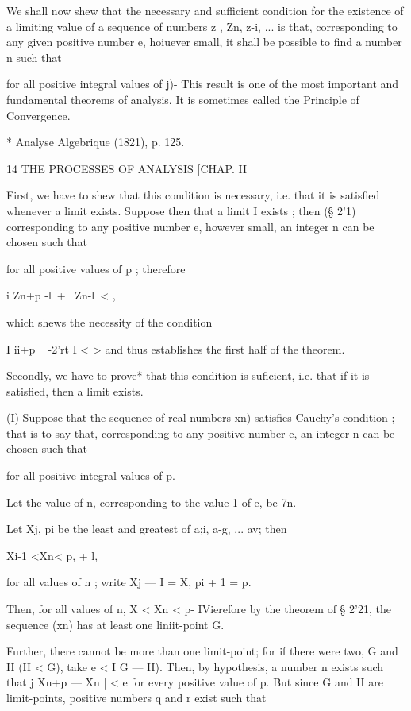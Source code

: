 We shall now shew that the necessary and sufficient condition for the
existence of a limiting value of a sequence of numbers z , Zn, z-i,
... is that, corresponding to any given positive number e, hoiuever
small, it shall be possible to find a number n such that

for all positive integral values of j)- This result is one of the most
important and fundamental theorems of analysis. It is sometimes called
the Principle of Convergence.

* Analyse Algebrique (1821), p. 125.



14 THE PROCESSES OF ANALYSIS [CHAP. II

First, we have to shew that this condition is necessary, i.e. that it
is satisfied whenever a limit exists. Suppose then that a limit I
exists ; then (§ 2'1) corresponding to any positive number e, however
small, an integer n can be chosen such that

for all positive values of p ; therefore

  i Zn+p -l\ + \ Zn-l\ < ,

which shews the necessity of the condition

I ii+p ~ -2'rt I < > and thus establishes the first half of the
theorem.

Secondly, we have to prove* that this condition is suficient, i.e.
that if it is satisfied, then a limit exists.

(I) Suppose that the sequence of real numbers xn) satisfies Cauchy's
condition ; that is to say that, corresponding to any positive number
e, an integer n can be chosen such that

for all positive integral values of p.

Let the value of n, corresponding to the value 1 of e, be 7n.

Let Xj, pi be the least and greatest of a;i, a-g, ... av; then

Xi-1 <Xn< p, + l,

for all values of n ; write Xj — I = X, pi + 1 = p.

Then, for all values of n, X < Xn < p- IVierefore by the theorem of §
2'21, the sequence (xn) has at least one liniit-point G.

Further, there cannot be more than one limit-point; for if there were
two, G and H (H < G), take e < I G — H). Then, by hypothesis, a number
n exists such that j Xn+p — Xn | < e for every positive value of p.
But since G and H are limit-points, positive numbers q and r exist
such that

